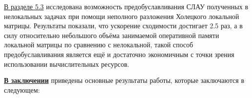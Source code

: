 \underline{В разделе 5.3} исследована возможность предобуславливания СЛАУ полученных в нелокальных задачах при помощи неполного разложения Холецкого локальной матрицы. Результаты показали, что ускорение сходимости достигает 2.5 раз, а в силу относительно небольшого объёма занимаемой оперативной памяти локальной матрицы по сравнению с нелокальной, такой способ предобуславливания является ещё и достаточно экономичным с точки зрения использовании вычислительных ресурсов.


\FloatBarrier
{}                                  %
\underline{\textbf{В заключении}} приведены основные результаты работы, которые заключаются в следующем:



